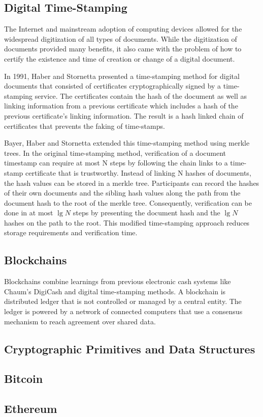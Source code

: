 \subsection{Digital Time-Stamping}

The Internet and mainstream adoption of computing devices allowed for the
widespread digitization of all types of documents. While the digitization of
documents provided many benefits, it also came with the problem of how to
certify the existence and time of creation or change of a digital document.

In 1991, Haber and Stornetta presented a time-stamping method for digital
documents that consisted of certificates cryptographically signed by a time-stamping service. The
certificates contain the hash of the document as well as linking information from a
previous certificate which includes a hash of the previous certificate's linking
information\cite{haber1991}. The result is a hash linked chain of certificates
that prevents the faking of time-stamps.

Bayer, Haber and Stornetta extended this time-stamping method using merkle
trees. In the original time-stamping method, verification of a document
timestamp can require at most N steps by following the chain links to a
time-stamp certificate that is trustworthy\cite{bayer1993}. Instead of linking N
hashes of documents, the hash values can be stored in a merkle tree.
Participants can record the hashes of their own documents and the sibling hash
values along the path from the document hash to the root of the merkle tree.
Consequently, verification can be done in at most $\lg N$ steps by presenting the
document hash and the $\lg N$ hashes on the path to the root. This modified
time-stamping approach reduces storage requirements and verification time.

\subsection{Blockchains}

Blockchains combine learnings from previous electronic cash systems like Chaum's
DigiCash and digital time-stamping methods. A blockchain is distributed ledger
that is not controlled or managed by a central entity. The ledger is powered by
a network of connected computers that use a consensus mechanism to reach agreement over shared data\cite{whatisblockchain}.

\subsection{Cryptographic Primitives and Data Structures}

\subsection{Bitcoin}

\subsection{Ethereum}

